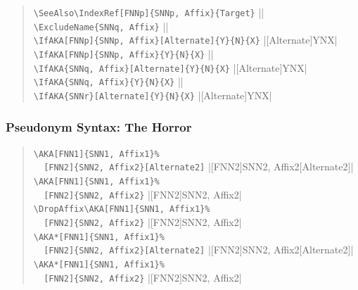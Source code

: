 \documentclass[oneside]{article}
\begin{document}
\begin{quote}
\Verb+\SeeAlso\IndexRef[FNNp]{SNNp, Affix}{Target}+\dotfill
  |\SeeAlso{}|\\
\Verb+\ExcludeName{SNNq, Affix}+\dotfill
  ||\\
\Verb+\IfAKA[FNNp]{SNNp, Affix}[Alternate]{Y}{N}{X}+\dotfill
  |[Alternate]{Y}{N}{X}|\\
\Verb+\IfAKA[FNNp]{SNNp, Affix}{Y}{N}{X}+\dotfill
  ||\\
\Verb+\IfAKA{SNNq, Affix}[Alternate]{Y}{N}{X}+\dotfill
  |[Alternate]{Y}{N}{X}|\\
\Verb+\IfAKA{SNNq, Affix}{Y}{N}{X}+\dotfill
  ||\\
\Verb+\IfAKA{SNNr}[Alternate]{Y}{N}{X}+\dotfill
  |[Alternate]{Y}{N}{X}|
\end{quote}

\subsubsection{Pseudonym Syntax: The Horror}

\begin{quote}
\Verb+\AKA[FNN1]{SNN1, Affix1}%+\\
\Verb+  [FNN2]{SNN2, Affix2}[Alternate2]+\dotfill
  |[FNN2]{SNN2, Affix2}[Alternate2]|\\
\Verb+\AKA[FNN1]{SNN1, Affix1}%+\\
\Verb+  [FNN2]{SNN2, Affix2}+\dotfill
  |[FNN2]{SNN2, Affix2}|\\
\Verb+\DropAffix\AKA[FNN1]{SNN1, Affix1}%+\\
\Verb+  [FNN2]{SNN2, Affix2}+\dotfill
  |\DropAffix{}[FNN2]{SNN2, Affix2}|\\
\Verb+\AKA*[FNN1]{SNN1, Affix1}%+\\
\Verb+  [FNN2]{SNN2, Affix2}[Alternate2]+\dotfill
  |[FNN2]{SNN2, Affix2}[Alternate2]|\\
\Verb+\AKA*[FNN1]{SNN1, Affix1}%+\\
\Verb+  [FNN2]{SNN2, Affix2}+\dotfill
  |[FNN2]{SNN2, Affix2}|
\end{quote}
\end{document}
